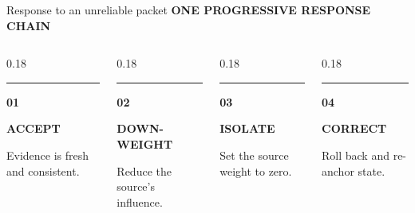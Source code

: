 \documentclass[aspectratio=169,11pt,xcolor=table]{beamer}
\newcommand{\eyebrow}[1]{%
  {\color{BrandCyan}\fontsize{7.5}{9}\selectfont\bfseries\MakeUppercase{#1}}\par\vspace{0.13cm}%
}
\begin{document}
\begin{frame}{Response to an unreliable packet}
  \eyebrow{One progressive response chain}
  \vspace{0.04cm}
  \begin{columns}[T,onlytextwidth]
    \begin{column}{0.18\textwidth}
      {\color{Good}\rule{\linewidth}{0.10cm}}\par\vspace{0.08cm}
      {\color{Good}\fontsize{16}{18}\selectfont\bfseries 01}\par
      {\fontsize{9.4}{11.2}\selectfont\bfseries ACCEPT}\par
      {\color{Muted}\fontsize{7.3}{8.8}\selectfont Evidence is fresh and consistent.}
    \end{column}
    \begin{column}{0.18\textwidth}
      {\color{BrandCyan}\rule{\linewidth}{0.10cm}}\par\vspace{0.08cm}
      {\color{BrandCyan}\fontsize{16}{18}\selectfont\bfseries 02}\par
      {\fontsize{9.4}{11.2}\selectfont\bfseries DOWN-WEIGHT}\par
      {\color{Muted}\fontsize{7.3}{8.8}\selectfont Reduce the source's influence.}
    \end{column}
    \begin{column}{0.18\textwidth}
      {\color{Warn}\rule{\linewidth}{0.10cm}}\par\vspace{0.08cm}
      {\color{Warn}\fontsize{16}{18}\selectfont\bfseries 03}\par
      {\fontsize{9.4}{11.2}\selectfont\bfseries ISOLATE}\par
      {\color{Muted}\fontsize{7.3}{8.8}\selectfont Set the source weight to zero.}
    \end{column}
    \begin{column}{0.18\textwidth}
      {\color{Purple}\rule{\linewidth}{0.10cm}}\par\vspace{0.08cm}
      {\color{Purple}\fontsize{16}{18}\selectfont\bfseries 04}\par
      {\fontsize{9.4}{11.2}\selectfont\bfseries CORRECT}\par
      {\color{Muted}\fontsize{7.3}{8.8}\selectfont Roll back and re-anchor state.}
    \end{column}

\end{columns}
\end{frame}
\end{document}
